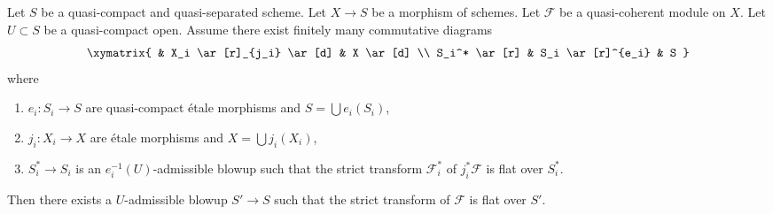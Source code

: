 \begin{lemma}
\label{lemma-flatten-module-etale-localize}
Let $S$ be a quasi-compact and quasi-separated scheme.
Let $X \to S$ be a morphism of schemes.
Let $\mathcal{F}$ be a quasi-coherent module on $X$.
Let $U \subset S$ be a quasi-compact open.
Assume there exist finitely many commutative diagrams
$$
\xymatrix{
& X_i \ar[r]_{j_i} \ar[d] & X \ar[d] \\
S_i^* \ar[r] & S_i \ar[r]^{e_i} & S
}
$$
where
\begin{enumerate}
\item $e_i : S_i \to S$ are quasi-compact \'etale morphisms and
$S = \bigcup e_i(S_i)$,
\item $j_i : X_i \to X$ are \'etale morphisms and
$X = \bigcup j_i(X_i)$,
\item $S^*_i \to S_i$ is an $e_i^{-1}(U)$-admissible blowup
such that the strict transform $\mathcal{F}_i^*$ of $j_i^*\mathcal{F}$
is flat over $S^*_i$.
\end{enumerate}
Then there exists a $U$-admissible blowup $S' \to S$ such that
the strict transform of $\mathcal{F}$ is flat over $S'$.
\end{lemma}

